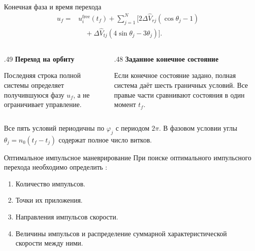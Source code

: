 \documentclass[11pt,aspectratio=169,t]{beamer}
\newcommand{\eqcompact}{\fontsize{10}{12}\selectfont}
\begin{document}
\begin{frame}{Конечная фаза и время перехода}
\relax
{\eqcompact\derivationmathspacing
\[
\boxed{\begin{aligned}
 u_f={}&u_i^{\mathrm{free}}(t_f)
    +\sum_{j=1}^{N}\bigl[2\Delta\widehat V_{rj}(\cos\theta_j-1)\\[2pt]
 &\quad+\Delta\widehat V_{tj}(4\sin\theta_j-3\theta_j)\bigr].
\end{aligned}}
\]
}
\begin{columns}[T,onlytextwidth]
\begin{column}{.49\textwidth}
\textcolor{courseaccent}{\textbf{Переход на орбиту}}\par\smallskip
\RaggedRight
Последняя строка полной системы определяет получившуюся фазу $u_f$, а не ограничивает управление.

\end{column}
\begin{column}{.48\textwidth}
\textcolor{courseaccent}{\textbf{Заданное конечное состояние}}\par\smallskip
\RaggedRight
Если конечное состояние задано, полная система даёт шесть граничных условий. Все правые части сравнивают состояния в один момент $t_f$.

\end{column}
\end{columns}
Все пять условий периодичны по $\varphi_j$ с периодом $2\pi$. В фазовом условии углы $\theta_j=n_0(t_f-t_j)$ содержат полное число витков.
\end{frame}

\begin{frame}{Оптимальное импульсное маневрирование}
\relax
При поиске оптимального импульсного перехода необходимо определить \cite{EdelbaumGobetzWashington1966}:
\medskip
\begin{enumerate}
 \setlength{\itemsep}{10pt}
 \item Количество импульсов.
 \item Точки их приложения.
 \item Направления импульсов скорости.
 \item Величины импульсов и распределение суммарной характеристической скорости между ними.
\end{enumerate}
\end{frame}
\end{document}
